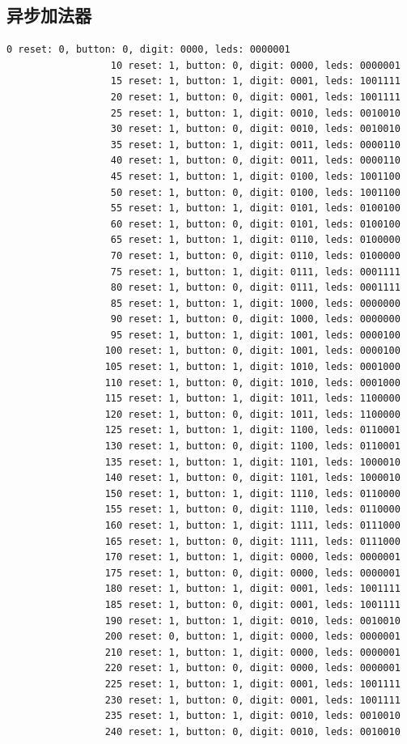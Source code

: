 \documentclass[11pt,a4paper]{article}
\begin{document}
\subsection{异步加法器}
\begin{Verbatim}[fontsize=\scriptsize]
                   0 reset: 0, button: 0, digit: 0000, leds: 0000001
                  10 reset: 1, button: 0, digit: 0000, leds: 0000001
                  15 reset: 1, button: 1, digit: 0001, leds: 1001111
                  20 reset: 1, button: 0, digit: 0001, leds: 1001111
                  25 reset: 1, button: 1, digit: 0010, leds: 0010010
                  30 reset: 1, button: 0, digit: 0010, leds: 0010010
                  35 reset: 1, button: 1, digit: 0011, leds: 0000110
                  40 reset: 1, button: 0, digit: 0011, leds: 0000110
                  45 reset: 1, button: 1, digit: 0100, leds: 1001100
                  50 reset: 1, button: 0, digit: 0100, leds: 1001100
                  55 reset: 1, button: 1, digit: 0101, leds: 0100100
                  60 reset: 1, button: 0, digit: 0101, leds: 0100100
                  65 reset: 1, button: 1, digit: 0110, leds: 0100000
                  70 reset: 1, button: 0, digit: 0110, leds: 0100000
                  75 reset: 1, button: 1, digit: 0111, leds: 0001111
                  80 reset: 1, button: 0, digit: 0111, leds: 0001111
                  85 reset: 1, button: 1, digit: 1000, leds: 0000000
                  90 reset: 1, button: 0, digit: 1000, leds: 0000000
                  95 reset: 1, button: 1, digit: 1001, leds: 0000100
                 100 reset: 1, button: 0, digit: 1001, leds: 0000100
                 105 reset: 1, button: 1, digit: 1010, leds: 0001000
                 110 reset: 1, button: 0, digit: 1010, leds: 0001000
                 115 reset: 1, button: 1, digit: 1011, leds: 1100000
                 120 reset: 1, button: 0, digit: 1011, leds: 1100000
                 125 reset: 1, button: 1, digit: 1100, leds: 0110001
                 130 reset: 1, button: 0, digit: 1100, leds: 0110001
                 135 reset: 1, button: 1, digit: 1101, leds: 1000010
                 140 reset: 1, button: 0, digit: 1101, leds: 1000010
                 150 reset: 1, button: 1, digit: 1110, leds: 0110000
                 155 reset: 1, button: 0, digit: 1110, leds: 0110000
                 160 reset: 1, button: 1, digit: 1111, leds: 0111000
                 165 reset: 1, button: 0, digit: 1111, leds: 0111000
                 170 reset: 1, button: 1, digit: 0000, leds: 0000001
                 175 reset: 1, button: 0, digit: 0000, leds: 0000001
                 180 reset: 1, button: 1, digit: 0001, leds: 1001111
                 185 reset: 1, button: 0, digit: 0001, leds: 1001111
                 190 reset: 1, button: 1, digit: 0010, leds: 0010010
                 200 reset: 0, button: 1, digit: 0000, leds: 0000001
                 210 reset: 1, button: 1, digit: 0000, leds: 0000001
                 220 reset: 1, button: 0, digit: 0000, leds: 0000001
                 225 reset: 1, button: 1, digit: 0001, leds: 1001111
                 230 reset: 1, button: 0, digit: 0001, leds: 1001111
                 235 reset: 1, button: 1, digit: 0010, leds: 0010010
                 240 reset: 1, button: 0, digit: 0010, leds: 0010010
\end{Verbatim}
\end{document}

